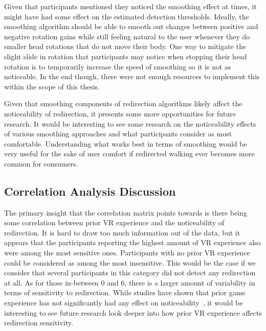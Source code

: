 Given that participants mentioned they noticed the smoothing effect at times, it might have had some effect on the estimated detection thresholds. Ideally, the smoothing algorithm should be able to smooth out changes between positive and negative rotation gains while still feeling natural to the user whenever they do smaller head rotations that do not move their body. One way to mitigate the slight slide in rotation that participants may notice when stopping their head rotation is to temporarily increase the speed of smoothing so it is not as noticeable. In the end though, there were not enough resources to implement this within the scope of this thesis. 

Given that smoothing components of redirection algorithms likely affect the noticeability of redirection, it presents some more opportunities for future research. It would be interesting to see some research on the noticeability effects of various smoothing approaches and what participants consider as most comfortable. Understanding what works best in terms of smoothing would be very useful for the sake of user comfort if redirected walking ever becomes more common for consumers. 

\subsection{Correlation Analysis Discussion}\label{sec:ex1demogDiscussion}
The primary insight that the correlation matrix points towards is there being some correlation between prior VR experience and the noticeability of redirection. It is hard to draw too much information out of the data, but it appears that the participants reporting the highest amount of VR experience also were among the most sensitive ones. Participants with no prior VR experience could be considered as among the most insensitive. This would be the case if we consider that several participants in this category did not detect any redirection at all. As for those in-between 0 and 6, there is a larger amount of variability in terms of sensitivity to redirection. While studies have shown that prior game experience has not significantly had any effect on noticeability~\cite{nguyen2018individual}, it would be interesting to see future research look deeper into how prior VR experience affects redirection sensitivity.

